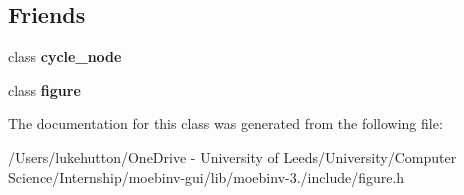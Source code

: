 \subsection*{Friends}
\begin{DoxyCompactItemize}
\item 
\mbox{\label{class_moeb_inv_1_1subfigure_ab1135e74268f9c17da7328c07edd8b09}} 
class {\bfseries cycle\+\_\+node}
\item 
\mbox{\label{class_moeb_inv_1_1subfigure_ac46ec1ee00928c9cde5b63a7edba7b7a}} 
class {\bfseries figure}
\end{DoxyCompactItemize}


The documentation for this class was generated from the following file\+:\begin{DoxyCompactItemize}
\item 
/\+Users/lukehutton/\+One\+Drive -\/ University of Leeds/\+University/\+Computer Science/\+Internship/moebinv-\/gui/lib/moebinv-\/3./include/figure.\+h\end{DoxyCompactItemize}
